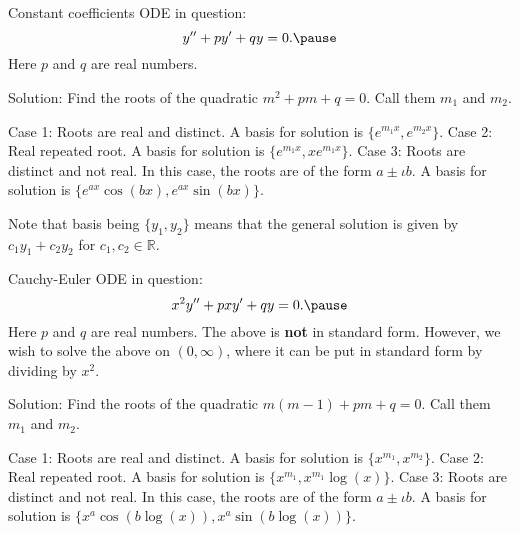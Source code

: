 \documentclass[dvipsnames]{beamer}
\theoremstyle{definition}
\begin{document}
\begin{frame}{Constant coefficients}
  ODE in question:
  \begin{equation*} 
    y'' + p y' + qy = 0. \pause
  \end{equation*}
  Here $p$ and $q$ are real numbers. \pause 

  Solution: Find the roots of the quadratic $m^{2} + pm + q = 0$. \pause Call them $m_{1}$ and $m_{2}$. \pause

  Case 1: Roots are real and distinct. \pause A basis for solution is $\{e^{m_{1} x}, e^{m_{2} x}\}$. \pause \newline
  Case 2: Real repeated root. \pause A basis for solution is $\{e^{m_{1} x}, x e^{m_{1} x}\}$. \pause \newline
  Case 3: Roots are distinct and not real. \pause In this case, the roots are of the form $a \pm \iota b$. \pause A basis for solution is $\{e^{a x} \cos(bx), e^{a x} \sin(bx)\}$. \pause
  
  Note that basis being $\{y_{1}, y_{2}\}$ means that the general solution is given by $c_{1} y_{1} + c_{2} y_{2}$ for $c_{1}, c_{2} \in \mathbb{R}$.
\end{frame}
\begin{frame}{Cauchy-Euler}
  ODE in question:
  \begin{equation*} 
    x^{2} y'' + p xy' + qy = 0. \pause
  \end{equation*}
  Here $p$ and $q$ are real numbers. \pause The above is \textbf{not} in standard form. \pause However, we wish to solve the above on $(0, \infty)$, where it can be put in standard form by dividing by $x^{2}$. \pause

  Solution: Find the roots of the quadratic $m(m - 1) + pm + q = 0$. \pause Call them $m_{1}$ and $m_{2}$. \pause

  Case 1: Roots are real and distinct. \pause A basis for solution is $\{x^{m_{1}}, x^{m_{2}}\}$. \pause \newline
  Case 2: Real repeated root. \pause A basis for solution is $\{x^{m_{1}}, x^{m_{1}} \log(x)\}$. \pause \newline
  Case 3: Roots are distinct and not real. \pause In this case, the roots are of the form $a \pm \iota b$. \pause A basis for solution is $\{x^{a} \cos(b \log(x)), x^{a} \sin(b \log(x))\}$.
\end{frame}
\end{document}
